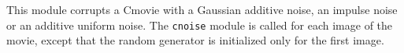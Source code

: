 This module corrupts a Cmovie with a Gaussian additive noise, an
impulse noise or an additive uniform noise. 
The \verb+cnoise+ module is called for each image
of the movie, except that the random generator is initialized
only for the first image.
